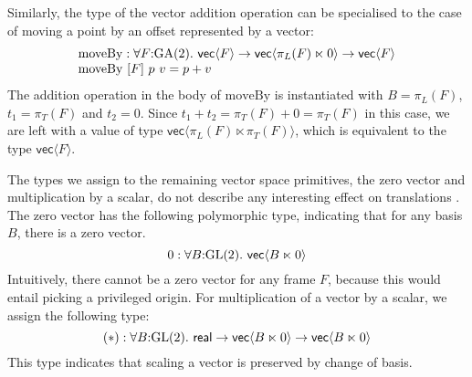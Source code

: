 Similarly, the type of the vector addition operation can be
specialised to the case of moving a point by an offset represented by
a vector:
\begin{displaymath}
  \begin{array}{l}
    \mathrm{moveBy} : \forall F \mathord:\mathrm{GA}(2).\ \mathsf{vec}\langle F \rangle \to \mathsf{vec}\langle \pi_L(F) \ltimes 0 \rangle \to \mathsf{vec}\langle F \rangle \\
    \mathrm{moveBy}\ [F]\ p\ v = p + v
  \end{array}
\end{displaymath}
The addition operation in the body of $\mathrm{moveBy}$ is
instantiated with $B = \pi_L(F)$, $t_1 = \pi_T(F)$ and $t_2 =
0$. Since $t_1 + t_2 = \pi_T(F) + 0 = \pi_T(F)$ in this case, we are
left with a value of type $\mathsf{vec}\langle \pi_L(F) \ltimes
\pi_T(F) \rangle$, which is equivalent to the type
$\mathsf{vec}\langle F \rangle$.

The types we assign to the remaining vector space primitives, the zero
vector and multiplication by a scalar, do not describe any interesting
effect on translations%
. The zero vector has the following polymorphic type, indicating that
for any basis $B$, there is a zero vector.
\begin{displaymath}
  \mathrm{0} : \forall B \mathord: \mathrm{GL}(2).\ \mathsf{vec}\langle B \ltimes 0 \rangle
\end{displaymath}
Intuitively, there cannot be a zero vector for any frame $F$, because
this would entail picking a privileged origin. For multiplication of a
vector by a scalar, we assign the following type:
\begin{displaymath}
  (*) : \forall B \mathord: \GL(2).\ \mathsf{real} \to \mathsf{vec}\langle B \ltimes 0 \rangle \to \mathsf{vec}\langle B \ltimes 0 \rangle
\end{displaymath}
This type indicates that scaling a vector is preserved by change of
basis.


